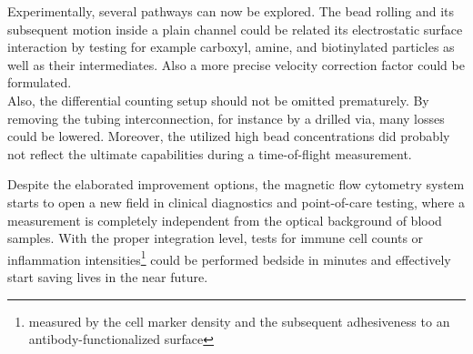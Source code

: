 Experimentally, several pathways can now be explored. The bead rolling and its subsequent motion inside a plain channel could be related its electrostatic surface interaction by testing for example \gls{carboxyl}, \gls{amine}, and biotinylated particles as well as their intermediates. Also a more precise velocity correction factor could be formulated.\\
Also, the differential counting setup should not be omitted prematurely. By removing the tubing interconnection, for instance by a drilled via, many losses could be lowered. Moreover, the utilized high bead concentrations did probably not reflect the ultimate capabilities during a time-of-flight measurement.

Despite the elaborated improvement options, the magnetic flow cytometry system starts to open a new field in clinical diagnostics and point-of-care testing, where a measurement is completely independent from the optical background of blood samples. With the proper integration level, tests for immune cell counts or inflammation intensities\footnote{measured by the cell marker density and the subsequent adhesiveness to an antibody-functionalized surface} could be performed bedside in minutes and effectively start saving lives in the near future. 


